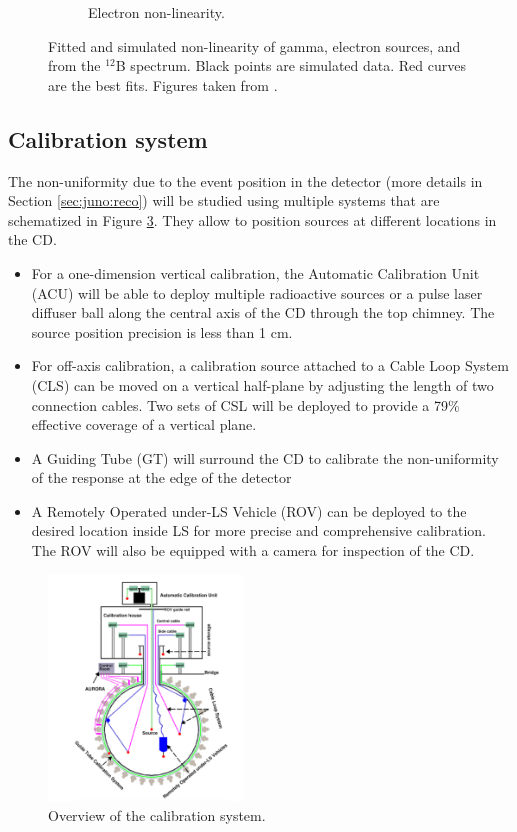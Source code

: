 \documentclass[../main.tex]{subfiles}
\begin{document}
\begin{figure}[ht]
\begin{subfigure}[b]{0.37\textwidth}
    \caption{Electron non-linearity.}
    \label{fig:juno:nl:electron}
  \end{subfigure}
  \caption{Fitted and simulated non-linearity of gamma, electron sources, and from the $^{12}$B spectrum. Black points are simulated data. Red curves are the best fits. Figures taken from \cite{juno_collaboration_calibration_2021}.}
  \label{fig:juno:nl}
\end{figure}

\subsection{Calibration system}

The non-uniformity due to the event position in the detector (more details in Section \ref{sec:juno:reco}) will be studied using multiple systems that are schematized in Figure \ref{fig:juno:calib}. They allow to position sources at different locations in the CD.

\begin{itemize}
  \item For a one-dimension vertical calibration, the Automatic Calibration Unit (ACU) will be able to deploy multiple radioactive sources or a pulse laser diffuser ball along the central axis of the CD through the top chimney. The source position precision is less than 1 cm.
  \item For off-axis calibration, a calibration source attached to a Cable Loop System (CLS) can be moved on a vertical half-plane by adjusting the length of two connection cables. Two sets of CSL will be deployed to provide a 79\% effective coverage of a vertical plane.
  \item A Guiding Tube (GT) will surround the CD to calibrate the non-uniformity of the response at the edge of the detector
  \item A Remotely Operated under-LS Vehicle (ROV) can be deployed to the desired location inside LS for more precise and comprehensive calibration. The ROV will also be equipped with a camera for inspection of the CD.
\end{itemize}

\begin{figure}[ht]
  \centering
  \includegraphics[height=6cm]{images/juno/calib.png}
  \caption{Overview of the calibration system.}
  \label{fig:juno:calib}
\end{figure}
\end{document}
